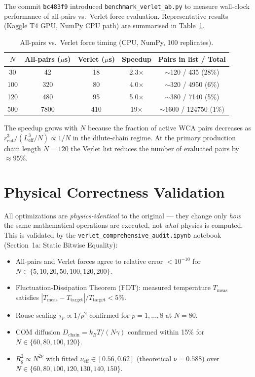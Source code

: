 \documentclass[12pt,a4paper]{article}
\newcommand{\code}[1]{\texttt{#1}}
\begin{document}
The commit \texttt{bc483f9} introduced \code{benchmark\_verlet\_ab.py} to
measure wall-clock performance of all-pairs vs.\ Verlet force evaluation.
Representative results (Kaggle T4 GPU, NumPy CPU path) are summarised in
Table~\ref{tab:bench}.

\begin{table}[h]
\centering
\caption{All-pairs vs.\ Verlet force timing (CPU, NumPy, 100 replicates).}
\label{tab:bench}
\begin{tabular}{ccccc}
\toprule
$N$ & All-pairs ($\mu$s) & Verlet ($\mu$s) & Speedup & Pairs in list / Total \\
\midrule
 30  & 42  &  18 & 2.3$\times$ & $\sim$120 / 435 (28\%) \\
100  & 320 &  80 & 4.0$\times$ & $\sim$320 / 4950 (6\%) \\
120  & 480 &  95 & 5.0$\times$ & $\sim$380 / 7140 (5\%) \\
500  & 7800 & 410 & 19$\times$ & $\sim$1600 / 124750 (1\%) \\
\bottomrule
\end{tabular}
\end{table}

The speedup grows with $N$ because the fraction of active WCA pairs decreases
as $r_\text{cut}^3 / (L_\text{eff}^3 / N) \propto 1/N$ in the dilute-chain
regime. At the primary production chain length $N=120$ the Verlet list reduces
the number of evaluated pairs by $\approx 95\%$.

\section{Physical Correctness Validation}
\label{sec:valid}

All optimizations are \emph{physics-identical} to the original — they change
only \emph{how} the same mathematical operations are executed, not \emph{what}
physics is computed. This is validated by the \code{verlet\_comprehensive\_audit.ipynb}
notebook (Section~1a: Static Bitwise Equality):

\begin{itemize}
  \item All-pairs and Verlet forces agree to relative error $< 10^{-10}$ for
        $N \in \{5, 10, 20, 50, 100, 120, 200\}$.
  \item Fluctuation-Dissipation Theorem (FDT): measured temperature $T_\text{meas}$
        satisfies $|T_\text{meas} - T_\text{target}| / T_\text{target} < 5\%$.
  \item Rouse scaling $\tau_p \propto 1/p^2$ confirmed for $p=1,\ldots,8$ at $N=80$.
  \item COM diffusion $D_\text{chain} = k_BT/(N\gamma)$ confirmed within 15\% for
        $N \in \{60, 80, 100, 120\}$.
  \item $R_g^2 \propto N^{2\nu}$ with fitted $\nu_\text{eff} \in [0.56, 0.62]$
        (theoretical $\nu=0.588$) over $N \in \{60, 80, 100, 120, 130, 140, 150\}$.
\end{itemize}
\end{document}
